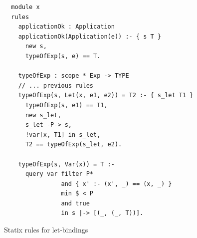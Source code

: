       \begin{figure}[h]
        \begin{verbatim}
  module x
  rules
    applicationOk : Application
    applicationOk(Application(e)) :- { s T }
      new s,
      typeOfExp(s, e) == T.

    typeOfExp : scope * Exp -> TYPE
    // ... previous rules
    typeOfExp(s, Let(x, e1, e2)) = T2 :- { s_let T1 }
      typeOfExp(s, e1) == T1,
      new s_let,
      s_let -P-> s,
      !var[x, T1] in s_let,
      T2 == typeOfExp(s_let, e2).

    typeOfExp(s, Var(x)) = T :-
      query var filter P*
                and { x' :- (x', _) == (x, _) }
                min $ < P
                and true
                in s |-> [(_, (_, T))].
        \end{verbatim}
        \caption{\label{fig:statix-let-binding-rules}Statix rules for let-bindings}
      \end{figure}

